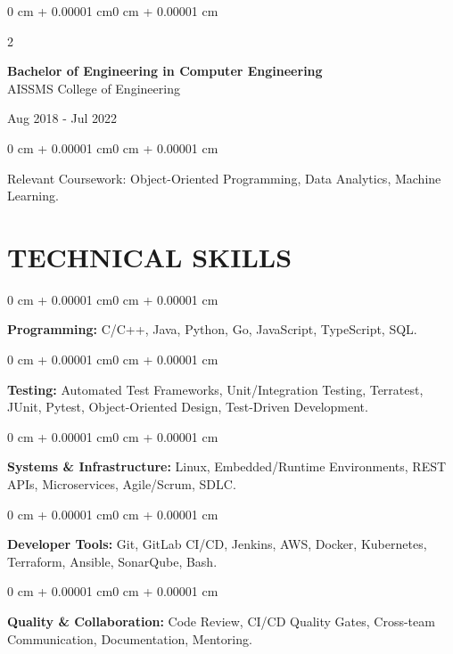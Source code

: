 \documentclass[10pt, letterpaper]{article}
\newenvironment{onecolentry}{
    \begin{adjustwidth}{0 cm + 0.00001 cm}{0 cm + 0.00001 cm}
}{
    \end{adjustwidth}
}
\newenvironment{twocolentry}[2][]{
    \onecolentry
    \def\secondColumn{#2}
    \setcolumnwidth{\fill, 4.5 cm}
    \begin{paracol}{2}
}{
    \switchcolumn \raggedleft \secondColumn
    \end{paracol}
    \endonecolentry
}
\begin{document}
\begin{twocolentry}{
    Aug 2018 - Jul 2022
}
    \textbf{Bachelor of Engineering in Computer Engineering} \\
    AISSMS College of Engineering
\end{twocolentry}
\begin{onecolentry}
Relevant Coursework: Object-Oriented Programming, Data Analytics, Machine Learning.
\end{onecolentry}
\section{TECHNICAL SKILLS}
\begin{onecolentry}
\textbf{Programming:} C/C++, Java, Python, Go, JavaScript, TypeScript, SQL.
\end{onecolentry}
\vspace{0.06 cm}
\begin{onecolentry}
\textbf{Testing:} Automated Test Frameworks, Unit/Integration Testing, Terratest, JUnit, Pytest, Object-Oriented Design, Test-Driven Development.
\end{onecolentry}
\vspace{0.06 cm}
\begin{onecolentry}
\textbf{Systems \& Infrastructure:} Linux, Embedded/Runtime Environments, REST APIs, Microservices, Agile/Scrum, SDLC.
\end{onecolentry}
\vspace{0.06 cm}
\begin{onecolentry}
\textbf{Developer Tools:} Git, GitLab CI/CD, Jenkins, AWS, Docker, Kubernetes, Terraform, Ansible, SonarQube, Bash.
\end{onecolentry}
\vspace{0.06 cm}
\begin{onecolentry}
\textbf{Quality \& Collaboration:} Code Review, CI/CD Quality Gates, Cross-team Communication, Documentation, Mentoring.
\end{onecolentry}

\end{document}
